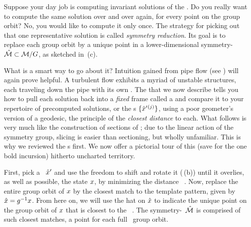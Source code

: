 \documentclass[aip,cha,reprint,
secnumarabic,
nofootinbib, tightenlines,
nobibnotes, showkeys, showpacs,
groupedaddress
]{revtex4-1}
\begin{document}
Suppose your day job is computing invariant solutions of the \NSe. Do you
really want to compute the same solution over and over again, for every
point on the group orbit? No, you would like to compute it only once. The
strategy for picking out that one representative solution is called
\emph{symmetry reduction}. Its goal is to replace each group orbit by a
unique point in a lower-dimensional symmetry-\reducedsp\ $\hat{\cal M} \subset
{\cal M}/G$, as sketched in \,(c).

What is a smart way to go about it? Intuition gained from pipe flow (see
) will again prove helpful. A turbulent flow
exhibits a myriad of unstable structures, each traveling down the pipe
with its own {\phaseVel}. The
\mslices{} that we now
describe tells you how to pull each solution back into a {\em fixed}
frame called a \emph{\slice} and compare it to your repertoire of
precomputed solutions, or the \template s $\{{\hat{x}'}{}^{(j)}\}$, using a
poor geometer's version of a geodesic, the principle of the \emph{closest
distance} to each. What follows is very much like the construction of
sections of ; due to the linear action of the symmetry
group, slicing is easier than sectioning, but wholly unfamiliar. This is
why we reviewed the \PoincSec s first. We now offer a pictorial tour of
this (save for the one bold incursion) hitherto uncharted
territory.

First, pick a \template\ ${\hat{x}'}$ and use the freedom to shift and
rotate it (\,(b)) until it overlies, as well as
possible, the state $x$, by minimizing the distance
\beq
\Norm{\ssp - \LieEl(\gSpace)\,\slicep}
\, .
Now, replace the entire group orbit of $x$ by the closest match to the
template pattern, given by $\hat{x}=g^{-1}x$. From here on, we
will use the hat on $\hat{x}$ to indicate the unique point on the group
orbit of $x$ that is closest to the \template\ \slicep. The
symmetry-\reducedsp\ $\hat{\cal M}$ is comprised of such closest matches, a
point for each full \statesp\ group orbit.
\end{document}
